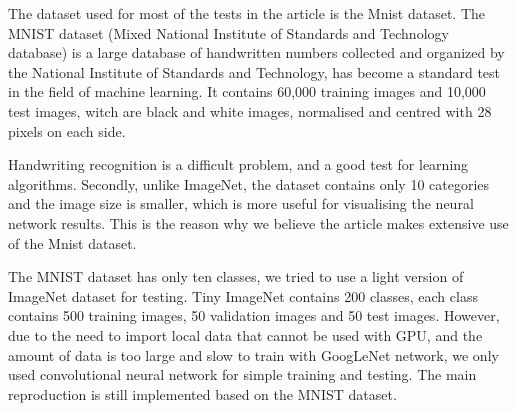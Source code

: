 
The dataset used for most of the tests in the article is the Mnist dataset. The MNIST dataset (Mixed National Institute of Standards and Technology database) is a large database of handwritten numbers collected and organized by the National Institute of Standards and Technology, has become a standard test in the field of machine learning. It contains 60,000 training images and 10,000 test images, witch are black and white images, normalised and centred with 28 pixels on each side.

Handwriting recognition is a difficult problem, and a good test for learning algorithms. Secondly, unlike ImageNet, the dataset contains only 10 categories and the image size is smaller, which is more useful for visualising the neural network results. This is the reason why we believe the article makes extensive use of the Mnist dataset.

The MNIST dataset has only ten classes, we tried to use a light version of ImageNet dataset for testing. Tiny ImageNet contains 200 classes, each class contains 500 training images, 50 validation images and 50 test images. However, due to the need to import local data that cannot be used with GPU, and the amount of data is too large and slow to train with GoogLeNet network, we only used convolutional neural network for simple training and testing. The main reproduction is still implemented based on the MNIST dataset.
